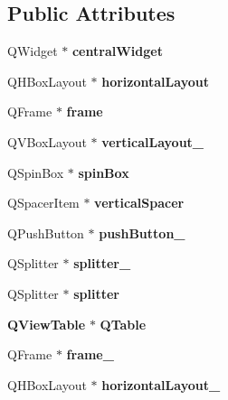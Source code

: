 \subsection*{Public Attributes}
\begin{DoxyCompactItemize}
\item 
Q\-Widget $\ast$ {\bfseries central\-Widget}\label{class_ui___main_window_a6600dd3bdd3d55e535659e4a4096ea48}

\item 
Q\-H\-Box\-Layout $\ast$ {\bfseries horizontal\-Layout}\label{class_ui___main_window_ae7104d878681f568e492c5bd0f653157}

\item 
Q\-Frame $\ast$ {\bfseries frame}\label{class_ui___main_window_a0a6f09c1b54d40d3900cac8179e189bf}

\item 
Q\-V\-Box\-Layout $\ast$ {\bfseries vertical\-Layout\-\_}\label{class_ui___main_window_afbe60c634b3214ee76ff9e1fa70c7801}

\item 
Q\-Spin\-Box $\ast$ {\bfseries spin\-Box}\label{class_ui___main_window_a0ecf336f5c740a4fe679d429781d0cb5}

\item 
Q\-Spacer\-Item $\ast$ {\bfseries vertical\-Spacer}\label{class_ui___main_window_a2c53f7f2e3106a4225d5be295e1315ae}

\item 
Q\-Push\-Button $\ast$ {\bfseries push\-Button\-\_}\label{class_ui___main_window_a6db9cf2b9979472a16e8a7e79c1950bf}

\item 
Q\-Splitter $\ast$ {\bfseries splitter\-\_}\label{class_ui___main_window_a59fddea9485f8346c7bb5d2126c547a0}

\item 
Q\-Splitter $\ast$ {\bfseries splitter}\label{class_ui___main_window_aa9aced3c49e5cad22d46b6fa7a3d5292}

\item 
{\bf Q\-View\-Table} $\ast$ {\bfseries Q\-Table}\label{class_ui___main_window_ac43fa751c51da69c2de7ec18be1bc3e0}

\item 
Q\-Frame $\ast$ {\bfseries frame\-\_}\label{class_ui___main_window_a27f45274513176c15239705dfafc2ecb}

\item 
Q\-H\-Box\-Layout $\ast$ {\bfseries horizontal\-Layout\-\_}\label{class_ui___main_window_a9ee21d2c2bc000e7a8ba931bacfc5a69}


\end{DoxyCompactItemize}
